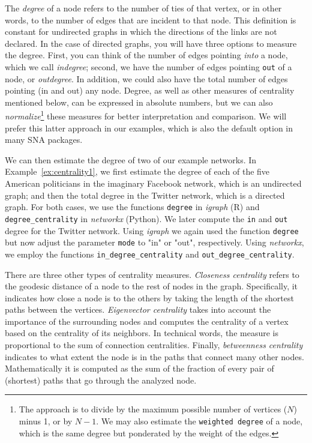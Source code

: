 The \emph{degree} of a node refers to the number of ties of that vertex, or in other words, to the number of edges that are incident to that node. This definition is constant for undirected graphs in which the directions of the links are not declared. In the case of directed graphs, you will have three options to measure the degree. First, you can think of the number of edges pointing \emph{into} a node, which we call \emph{indegree}; second, we have the number of edges pointing \texttt{out} of a node, or \emph{outdegree}. In addition, we could also have the total number of edges pointing (in and out) any node. Degree, as well as other measures of centrality mentioned below, can be expressed in absolute numbers, but we can also \emph{normalize}\footnote{The approach is to divide by the maximum possible number of vertices ($N$) minus 1, or by $N-1$. We may also estimate the \texttt{weighted degree} of a node, which is the same degree but ponderated by the weight of the edges.}  these measures for better interpretation and comparison. We will prefer this latter approach in our examples, which is also the default option in many SNA packages.

We can then estimate the degree of two of our example networks. In Example~\ref{ex:centrality1}, we first estimate the degree of each of the five American politicians in the imaginary Facebook network, which is an undirected graph; and then the total degree in the Twitter network, which is a directed graph. For both cases, we use the functions \texttt{degree} in \emph{igraph} (R) and \texttt{degree\_centrality} in \emph{networkx} (Python). We later compute the \texttt{in} and \texttt{out} degree for the Twitter network. Using \emph{igraph} we again used the function \texttt{degree} but now adjust the parameter \texttt{mode} to "in" or "out", respectively. Using \emph{networkx}, we employ the functions \texttt{in\_degree\_centrality} and \texttt{out\_degree\_centrality}.


There are three other types of centrality measures. \emph{Closeness centrality} refers to the geodesic distance of a node to the rest of nodes in the graph. Specifically, it indicates how close a node is to the others by taking the length of the shortest paths between the vertices. \emph{Eigenvector centrality} takes into account the importance of the surrounding nodes and computes the centrality of a vertex based on the centrality of its neighbors. In technical words, the measure is proportional to the sum of connection centralities. Finally, \emph{betweenness centrality} indicates to what extent the node is in the paths that connect many other nodes. Mathematically it is computed as the sum of the fraction of every pair of (shortest) paths that go through the analyzed node.

